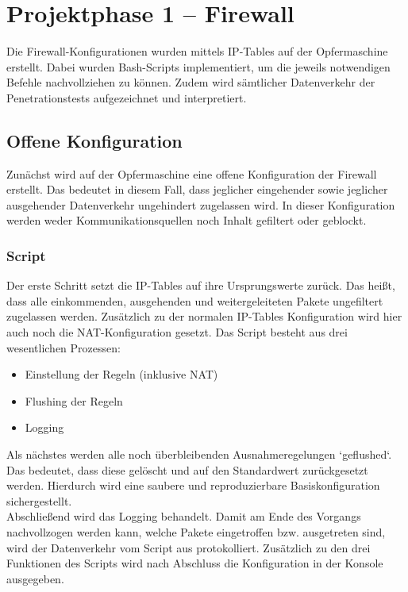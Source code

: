 \chapter{Projektphase 1 – Firewall}
Die Firewall-Konfigurationen wurden mittels IP-Tables auf der Opfermaschine erstellt. Dabei wurden Bash-Scripts implementiert, um die jeweils notwendigen Befehle nachvollziehen zu können. Zudem wird sämtlicher Datenverkehr der Penetrationstests aufgezeichnet und interpretiert. 
\section{Offene Konfiguration}

Zunächst wird auf der Opfermaschine eine offene Konfiguration der Firewall erstellt. Das bedeutet in diesem Fall, dass jeglicher eingehender sowie jeglicher ausgehender Datenverkehr ungehindert zugelassen wird. In dieser Konfiguration werden weder Kommunikationsquellen noch Inhalt gefiltert oder geblockt.

\subsection{Script}
Der erste Schritt setzt die IP-Tables auf ihre Ursprungswerte zurück. Das heißt, dass alle einkommenden, ausgehenden und weitergeleiteten Pakete ungefiltert zugelassen werden. Zusätzlich zu der normalen IP-Tables Konfiguration wird hier auch noch die NAT-Konfiguration gesetzt.  
Das Script besteht aus drei wesentlichen Prozessen: 
\begin{itemize}
	\item Einstellung der Regeln (inklusive NAT)
	\item Flushing der Regeln
	\item Logging
\end{itemize} 

Als nächstes werden alle noch überbleibenden Ausnahmeregelungen `geflushed`. Das bedeutet, dass diese gelöscht und auf den Standardwert zurückgesetzt werden. Hierdurch wird eine saubere und reproduzierbare Basiskonfiguration sichergestellt.\\
Abschließend wird das Logging behandelt. Damit am Ende des Vorgangs nachvollzogen werden kann, welche Pakete eingetroffen bzw. ausgetreten sind, wird der Datenverkehr vom Script aus protokolliert.
Zusätzlich zu den drei Funktionen des Scripts wird nach Abschluss die Konfiguration in der Konsole ausgegeben.

\newpage

